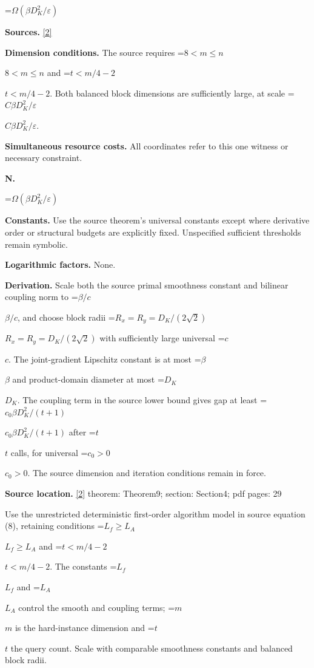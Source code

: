\documentclass[10pt,a4paper]{article}
\newcommand{\AtlasMath}[1]{\par\begingroup\centering\setbox0=\hbox{$\displaystyle #1$}\ifdim\wd0>1.4\linewidth\typeout{ATLAS WIDE FORMULA: \the\wd0}\fi\ifdim\wd0>\linewidth\resizebox{\linewidth}{!}{\box0}\else\box0\fi\par\endgroup}
\newcommand{\AtlasInlineMath}[1]{\begingroup\setbox0=\hbox{$#1$}\ifdim\wd0>.4\linewidth\endgroup\AtlasMath{#1}\else\endgroup$#1$\fi}
\begin{document}
\AtlasMath{\Omega(\beta D_K^2/\varepsilon)}


\textbf{Sources.} \href{https://arxiv.org/pdf/1808.02901}{[2]}



\textbf{Dimension conditions.} The source requires \AtlasInlineMath{8<m\le n} and \AtlasInlineMath{t<m/4-2}. Both balanced block dimensions are sufficiently large, at scale \AtlasInlineMath{C\beta D_K^2/\varepsilon}.



\textbf{Simultaneous resource costs.} All coordinates refer to this one witness or necessary constraint.



\textbf{N.}



\AtlasMath{\Omega(\beta D_K^2/\varepsilon)}


\textbf{Constants.} Use the source theorem’s universal constants except where derivative order or structural budgets are explicitly fixed. Unspecified sufficient thresholds remain symbolic.



\textbf{Logarithmic factors.} None.



\textbf{Derivation.} Scale both the source primal smoothness constant and bilinear coupling norm to \AtlasInlineMath{\beta/c}, and choose block radii \AtlasInlineMath{R_x=R_y=D_K/(2\sqrt2)} with sufficiently large universal \AtlasInlineMath{c}. The joint-gradient Lipschitz constant is at most \AtlasInlineMath{\beta} and product-domain diameter at most \AtlasInlineMath{D_K}. The coupling term in the source lower bound gives gap at least \AtlasInlineMath{c_0\beta D_K^2/(t+1)} after \AtlasInlineMath{t} calls, for universal \AtlasInlineMath{c_0>0}. The source dimension and iteration conditions remain in force.



\textbf{Source location.} \href{https://arxiv.org/pdf/1808.02901}{[2]} theorem: Theorem9; section: Section4; pdf pages: 29



Use the unrestricted deterministic first-order algorithm model in source equation (8), retaining conditions \AtlasInlineMath{L_f\ge L_A} and \AtlasInlineMath{t<m/4-2}. The constants \AtlasInlineMath{L_f} and \AtlasInlineMath{L_A} control the smooth and coupling terms; \AtlasInlineMath{m} is the hard-instance dimension and \AtlasInlineMath{t} the query count. Scale with comparable smoothness constants and balanced block radii.
\end{document}

